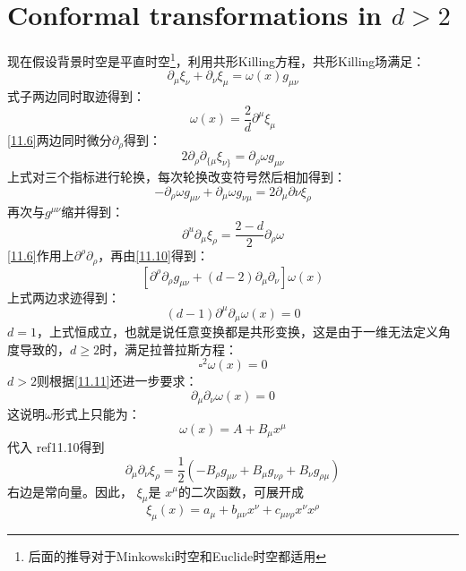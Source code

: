 \section{Conformal transformations in $d>2$}
	现在假设背景时空是平直时空\footnote{后面的推导对于Minkowski时空和Euclide时空都适用}，利用共形Killing方程，共形Killing场满足：
	\begin{equation}\label{11.6}
		\partial_\mu\xi_\nu+\partial_\nu\xi_\mu = \omega(x)g_{\mu\nu}
	\end{equation}
	式子两边同时取迹得到：
	\begin{equation}\label{11.7}
		\omega(x)=\frac{2}{d}\partial^\mu\xi_\mu
	\end{equation}
	\ref{11.6}两边同时微分$\partial_\rho$得到：
	\begin{equation}
		2\partial_\rho\partial_{{\{\mu}}\xi_{{\nu\}}}=\partial_\rho\omega g_{\mu\nu}
	\end{equation}
	上式对三个指标进行轮换，每次轮换改变符号然后相加得到：
	\begin{equation}\label{11.9}
		-\partial_\rho \omega g_{\mu\nu}+\partial_\mu \omega g_{\nu\mu}=2\partial_\mu\partial\nu \xi_\rho
	\end{equation}
	再次与$g^{\mu\nu}$缩并得到：
	\begin{equation}\label{11.10}
		\partial^u\partial_\mu\xi_\rho=\frac{2-d}{2}\partial_\rho\omega
	\end{equation}
	\ref{11.6}作用上$\partial^\rho\partial_\rho$，再由\ref{11.10}得到：
	\begin{equation}\label{11.11}
		\left[\partial^\rho\partial_\rho g_{\mu\nu}+(d-2)\partial_\mu\partial_\nu\right]\omega(x)
	\end{equation}
	上式两边求迹得到：
	\begin{equation}
		(d-1)\partial^\mu\partial_\mu \omega(x)=0
	\end{equation}
	$d=1$，上式恒成立，也就是说任意变换都是共形变换，这是由于一维无法定义角度导致的，$d\geq 2$时，满足拉普拉斯方程：
	\begin{equation}
		\square^2 \omega(x)=0
	\end{equation}
	$d>2$则根据\ref{11.11}还进一步要求：
	\begin{equation}
		\partial_\mu\partial_\nu\omega(x)=0
	\end{equation}
	这说明$\omega$形式上只能为：
	\begin{equation}
		\omega(x)=A+B_\mu x^\mu
	\end{equation}
	代入 ref{11.10}得到
	\begin{equation}
		\partial_{\mu} \partial_{\nu} \xi_{\rho}=\frac{1}{2}\left(-B_{\rho} g_{\mu \nu}+B_{\mu} g_{\nu \rho}+B_{\nu} g_{\rho \mu}\right)
	\end{equation}
	右边是常向量。因此， $\xi_\mu $是 $x^\mu $的二次函数，可展开成
	\begin{equation}
		\xi_{\mu}(x)=a_{\mu}+b_{\mu \nu} x^{\nu}+c_{\mu \nu \rho} x^{\nu} x^{\rho}
	\end{equation}
	
